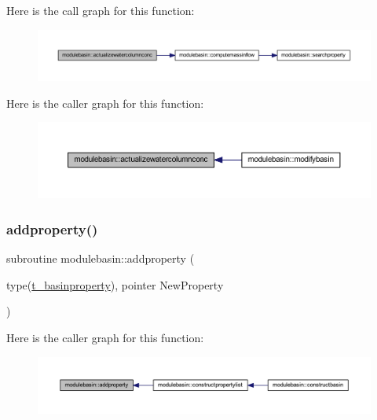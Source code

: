 Here is the call graph for this function\+:\nopagebreak
\begin{figure}[H]
\begin{center}
\leavevmode
\includegraphics[width=350pt]{namespacemodulebasin_a3ad94088588cc4ac448ba73dc73a3f61_cgraph}
\end{center}
\end{figure}
Here is the caller graph for this function\+:\nopagebreak
\begin{figure}[H]
\begin{center}
\leavevmode
\includegraphics[width=350pt]{namespacemodulebasin_a3ad94088588cc4ac448ba73dc73a3f61_icgraph}
\end{center}
\end{figure}
\mbox{\label{namespacemodulebasin_ad6d474b32a2a819360f61e25e869f0bd}} 
\subsubsection{\texorpdfstring{addproperty()}{addproperty()}}
{\footnotesize\ttfamily subroutine modulebasin\+::addproperty (\begin{DoxyParamCaption}\item[{type(\mbox{\hyperlink{structmodulebasin_1_1t__basinproperty}{t\+\_\+basinproperty}}), pointer}]{New\+Property }\end{DoxyParamCaption})\hspace{0.3cm}{\ttfamily [private]}}

Here is the caller graph for this function\+:\nopagebreak
\begin{figure}[H]
\begin{center}
\leavevmode
\includegraphics[width=350pt]{namespacemodulebasin_ad6d474b32a2a819360f61e25e869f0bd_icgraph}
\end{center}
\end{figure}
\mbox{\label{namespacemodulebasin_af1790be65f99274cd923932448358912}} 
